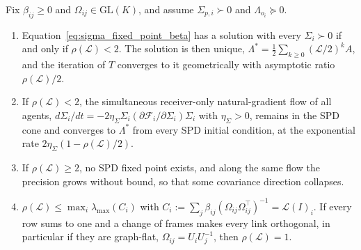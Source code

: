 \begin{proposition}
\label{prop:covariance_fixed_point}
Fix $\beta_{ij} \geq 0$ and $\Omega_{ij} \in \mathrm{GL}(K)$, and assume $\Sigma_{p,i} \succ 0$ and $\Lambda_{o_i} \succeq 0$.
\begin{enumerate}
\item[(i)] Equation~\eqref{eq:sigma_fixed_point_beta} has a solution with every $\Sigma_i \succ 0$ if and only if $\rho(\mathcal{L}) < 2$. The solution is then unique, $\Lambda^* = \tfrac{1}{2}\sum_{k \geq 0}(\mathcal{L}/2)^k A$, and the iteration of $T$ converges to it geometrically with asymptotic ratio $\rho(\mathcal{L})/2$.
\item[(ii)] If $\rho(\mathcal{L}) < 2$, the simultaneous receiver-only natural-gradient flow of all agents, $d\Sigma_i/dt = -2\eta_\Sigma\Sigma_i(\partial\mathcal{F}_i/\partial\Sigma_i)\Sigma_i$ with $\eta_\Sigma > 0$, remains in the SPD cone and converges to $\Lambda^*$ from every SPD initial condition, at the exponential rate $2\eta_\Sigma(1 - \rho(\mathcal{L})/2)$.
\item[(iii)] If $\rho(\mathcal{L}) \geq 2$, no SPD fixed point exists, and along the same flow the precision grows without bound, so that some covariance direction collapses.
\item[(iv)] $\rho(\mathcal{L}) \leq \max_i\lambda_{\max}(C_i)$ with $C_i := \sum_j\beta_{ij}(\Omega_{ij}\Omega_{ij}^\top)^{-1} = \mathcal{L}(I)_i$. If every row sums to one and a change of frames makes every link orthogonal, in particular if they are graph-flat, $\Omega_{ij} = U_iU_j^{-1}$, then $\rho(\mathcal{L}) = 1$.
\end{enumerate}
\end{proposition}

